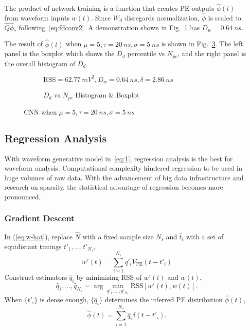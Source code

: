 The product of network training is a function that creates PE outputs $\hat{\phi}(t)$ from waveform inputs $w(t)$.  Since $W_d$ disregards normalization, $\hat{\phi}$ is scaled to $\hat{Q}\hat{\phi}_*$ following~\eqref{eq:fdconv2}. A demonstration shown in Fig.~\ref{fig:cnn} has $D_w = \SI{0.64}{ns}$. 

The result of $\hat{\phi}(t)$ when $\mu=5, \tau=\SI{20}{ns}, \sigma=\SI{5}{ns}$ is shown in Fig.~\ref{fig:cnn-npe}. The left panel is the boxplot which shows the $D_d$ percentile vs $N_{pe}$, and the right panel is the overall histogram of $D_d$. 

\begin{figure}[H]
  \begin{subfigure}{.5\textwidth}
    \centering
    \resizebox{\textwidth}{!}{}
    \caption{\label{fig:cnn}$\mathrm{RSS}=\SI{62.77}{mV^2},D_w=\SI{0.64}{ns},\delta=\SI{2.86}{ns}$}
  \end{subfigure}
  \begin{subfigure}{.5\textwidth}
    \centering
    \resizebox{\textwidth}{!}{}
    \caption{\label{fig:cnn-npe} $D_d$ vs $N_{pe}$ Histogram \& Boxplot}
  \end{subfigure}
  \caption{CNN when $\mu=5, \tau=\SI{20}{ns}, \sigma=\SI{5}{ns}$}
\end{figure}

\subsection{Regression Analysis}
With waveform generative model in~\eqref{eq:1}, regression analysis is the best for waveform analysis.  Computational complexity hindered regression to be used in huge volumes of raw data.  With the advancement of big data infrastructure and research on sparsity, the statistical advantage of regression becomes more pronounced.

\subsubsection{Gradient Descent}
In (\ref{eq:w-hat}), replace $\hat{N}$ with a fixed sample size $N_s$ and $\hat{t}_i$ with a set of equidistant timings $t'_1, \ldots, t'_{N_s}$,
\begin{equation}
  \label{eq:gd}
  w'(t) = \sum_{i=1}^{N_s}q'_iV_\mathrm{PE}(t-t'_i)
\end{equation}
Construct estimators $\hat{q}_i$ by minimizing RSS of $w'(t)$ and $w(t)$,
\begin{equation}
  \label{eq:gd-q}
  \hat{q}_1, \ldots, \hat{q}_{N_s} = \arg \underset{q'_1, \ldots, q'_{N_s}}{\min} \mathrm{RSS}\left[w'(t),w(t)\right].
\end{equation}
When $\{t'_i\}$ is dense enough, $\{\hat{q}_i\}$ determines the inferred PE distribution $\hat{\phi}(t)$,
\begin{equation}
  \label{eq:gd-phi}
  \hat{\phi}(t) = \sum_{i=1}^{N_s}\hat{q}_i\delta(t-t'_i).
\end{equation}


